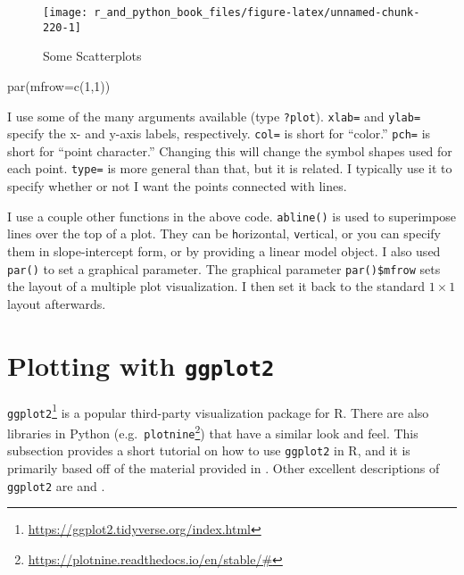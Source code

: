 \documentclass[
  12pt,
  krantz2]{krantz}
\makeatletter
\newenvironment{Shaded}{\begin{snugshade}}{\end{snugshade}}
\newcommand{\AttributeTok}[1]{\textcolor[rgb]{0.61,0.61,0.61}{#1}}
\newcommand{\DecValTok}[1]{\textcolor[rgb]{0.06,0.06,0.06}{#1}}
\newcommand{\FunctionTok}[1]{\textcolor[rgb]{0,0,0}{#1}}
\newcommand{\NormalTok}[1]{#1}
\renewcommand{\href}[2]{#2\footnote{\url{#1}}}
\newenvironment{kframe}{%
\medskip{}
\setlength{\fboxsep}{.8em}
 \def\at@end@of@kframe{}%
 \ifinner\ifhmode%
  \def\at@end@of@kframe{\end{minipage}}%
  \begin{minipage}{\columnwidth}%
 \fi\fi%
 \def\FrameCommand##1{\hskip\@totalleftmargin \hskip-\fboxsep
 \colorbox{shadecolor}{##1}\hskip-\fboxsep
     \hskip-\linewidth \hskip-\@totalleftmargin \hskip\columnwidth}%
 \MakeFramed {\advance\hsize-\width
   \@totalleftmargin\z@ \linewidth\hsize
   \@setminipage}}%
 {\par\unskip\endMakeFramed%
 \at@end@of@kframe}
\renewenvironment{Shaded}{\begin{kframe}}{\end{kframe}}
\makeatother
\begin{document}
\begin{figure}

{\centering \texttt{[image: r\_and\_python\_book\_files/figure-latex/unnamed-chunk-220-1]} 

}

\caption{Some Scatterplots}\label{fig:unnamed-chunk-220}
\end{figure}

\begin{Shaded}
\begin{Highlighting}[]
\FunctionTok{par}\NormalTok{(}\AttributeTok{mfrow=}\FunctionTok{c}\NormalTok{(}\DecValTok{1}\NormalTok{,}\DecValTok{1}\NormalTok{))}
\end{Highlighting}
\end{Shaded}

I use some of the many arguments available (type \texttt{?plot}). \texttt{xlab=} and \texttt{ylab=} specify the x- and y-axis labels, respectively. \texttt{col=} is short for ``color.'' \texttt{pch=} is short for ``point character.'' Changing this will change the symbol shapes used for each point. \texttt{type=} is more general than that, but it is related. I typically use it to specify whether or not I want the points connected with lines.

I use a couple other functions in the above code. \texttt{abline()} is used to superimpose lines over the top of a plot. They can be \texttt{h}orizontal, \texttt{v}ertical, or you can specify them in slope-intercept form, or by providing a linear model object. I also used \texttt{par()} to set a graphical parameter. The graphical parameter \texttt{par()\$mfrow} sets the layout of a multiple plot visualization. I then set it back to the standard \(1 \times 1\) layout afterwards.

\hypertarget{plotting-with-ggplot2}{%
\section{\texorpdfstring{Plotting with \texttt{ggplot2}}{Plotting with ggplot2}}\label{plotting-with-ggplot2}}

\href{https://ggplot2.tidyverse.org/index.html}{\texttt{ggplot2}} is a popular third-party visualization package for R. There are also libraries in Python (e.g.~\href{https://plotnine.readthedocs.io/en/stable/\#}{\texttt{plotnine}}) that have a similar look and feel. This subsection provides a short tutorial on how to use \texttt{ggplot2} in R, and it is primarily based off of the material provided in \citep{ggplot2}. Other excellent descriptions of \texttt{ggplot2} are \citep{r_in_action} and \citep{r_graphics_cookbook}.
\end{document}
